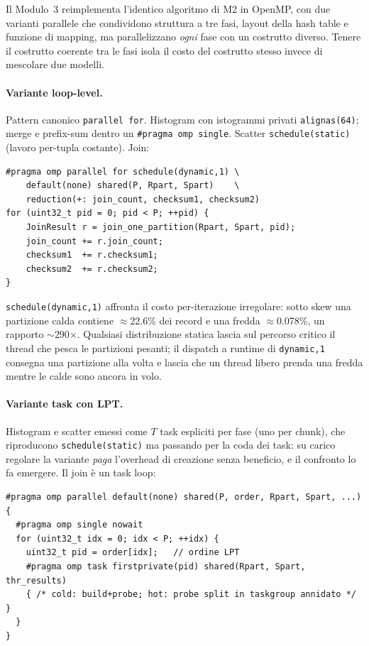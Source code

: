\documentclass[11pt,a4paper]{article}
\theoremstyle{remark}
\begin{document}
Il Modulo~3 reimplementa l'identico algoritmo di M2 in OpenMP, con due varianti parallele che condividono struttura a tre fasi, layout della hash table e funzione di mapping, ma parallelizzano \emph{ogni} fase con un costrutto diverso. Tenere il costrutto coerente tra le fasi isola il costo del costrutto stesso invece di mescolare due modelli.

\paragraph{Variante loop-level.} Pattern canonico \texttt{parallel for}. Histogram con istogrammi privati \texttt{alignas(64)}; merge e prefix-sum dentro un \texttt{\#pragma omp single}. Scatter \texttt{schedule(static)} (lavoro per-tupla costante). Join:

\begin{lstlisting}[style=cpp, caption={Join loop-level: dynamic,1 + reduction.}]
#pragma omp parallel for schedule(dynamic,1) \
    default(none) shared(P, Rpart, Spart)    \
    reduction(+: join_count, checksum1, checksum2)
for (uint32_t pid = 0; pid < P; ++pid) {
    JoinResult r = join_one_partition(Rpart, Spart, pid);
    join_count += r.join_count;
    checksum1  += r.checksum1;
    checksum2  += r.checksum2;
}
\end{lstlisting}

\texttt{schedule(dynamic,1)} affronta il costo per-iterazione irregolare: sotto skew una partizione calda contiene $\approx$22.6\% dei record e una fredda $\approx$0.078\%, un rapporto $\sim$290$\times$. Qualsiasi distribuzione statica lascia sul percorso critico il thread che pesca le partizioni pesanti; il dispatch a runtime di \texttt{dynamic,1} consegna una partizione alla volta e lascia che un thread libero prenda una fredda mentre le calde sono ancora in volo.

\paragraph{Variante task con LPT.} Histogram e scatter emessi come $T$ task espliciti per fase (uno per chunk), che riproducono \texttt{schedule(static)} ma passando per la coda dei task: su carico regolare la variante \emph{paga} l'overhead di creazione senza beneficio, e il confronto lo fa emergere. Il join \`e un task loop:

\begin{lstlisting}[style=cpp, caption={Join task-based: emissione in ordine LPT.}]
#pragma omp parallel default(none) shared(P, order, Rpart, Spart, ...)
{
  #pragma omp single nowait
  for (uint32_t idx = 0; idx < P; ++idx) {
    uint32_t pid = order[idx];   // ordine LPT
    #pragma omp task firstprivate(pid) shared(Rpart, Spart, thr_results)
    { /* cold: build+probe; hot: probe split in taskgroup annidato */ }
  }
}
\end{lstlisting}
\end{document}
